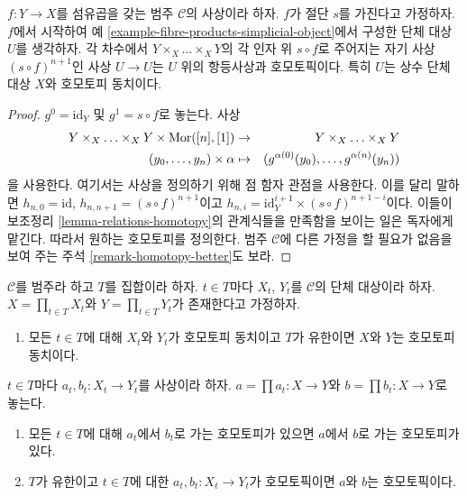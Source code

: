 \begin{lemma}
\label{lemma-fibre-products-simplicial-object-w-section}
$f : Y \to X$를 섬유곱을 갖는 범주 $\mathcal{C}$의 사상이라 하자.
$f$가 절단 $s$를 가진다고 가정하자. $f$에서 시작하여 예
\ref{example-fibre-products-simplicial-object}에서 구성한 단체 대상
$U$를 생각하자. 각 차수에서 $Y \times_X \ldots \times_X Y$의 각 인자
위 $s \circ f$로 주어지는 자기 사상 $(s \circ f)^{n + 1}$인 사상
$U \to U$는 $U$ 위의 항등사상과 호모토픽이다. 특히 $U$는 상수 단체
대상 $X$와 호모토피 동치이다.
\end{lemma}

\begin{proof}
$g^0 = \text{id}_Y$ 및 $g^1 = s \circ f$로 놓는다. 사상
\begin{eqnarray*}
Y \times_X \ldots \times_X Y \times \mathop{\mathrm{Mor}}\nolimits([n], [1])
& \to &
Y \times_X \ldots \times_X Y \\
(y_0, \ldots, y_n) \times \alpha
& \mapsto &
(g^{\alpha(0)}(y_0), \ldots, g^{\alpha(n)}(y_n))
\end{eqnarray*}
을 사용한다. 여기서는 사상을 정의하기 위해 점 함자 관점을 사용한다.
이를 달리 말하면
$h_{n, 0} = \text{id}$, $h_{n, n + 1} = (s \circ f)^{n + 1}$이고
$h_{n, i} = \text{id}_Y^{i + 1} \times (s \circ f)^{n + 1 - i}$이다.
이들이 보조정리 \ref{lemma-relations-homotopy}의 관계식들을 만족함을
보이는 일은 독자에게 맡긴다. 따라서 원하는 호모토피를 정의한다.
범주 $\mathcal{C}$에 다른 가정을 할 필요가 없음을 보여 주는 주석
\ref{remark-homotopy-better}도 보라.
\end{proof}

\begin{lemma}
\label{lemma-products-homotopy}
$\mathcal{C}$를 범주라 하고 $T$를 집합이라 하자. $t \in T$마다
$X_t$, $Y_t$를 $\mathcal{C}$의 단체 대상이라 하자.
$X = \prod_{t \in T} X_t$와 $Y = \prod_{t \in T} Y_t$가 존재한다고
가정하자.
\begin{enumerate}
\item 모든 $t \in T$에 대해 $X_t$와 $Y_t$가 호모토피 동치이고
$T$가 유한이면 $X$와 $Y$는 호모토피 동치이다.
\end{enumerate}
$t \in T$마다 $a_t, b_t : X_t \to Y_t$를 사상이라 하자.
$a = \prod a_t : X \to Y$와 $b = \prod b_t : X \to Y$로 놓는다.
\begin{enumerate}
\item[(2)] 모든 $t \in T$에 대해 $a_t$에서 $b_t$로 가는 호모토피가
있으면 $a$에서 $b$로 가는 호모토피가 있다.
\item[(3)] $T$가 유한이고 $t \in T$에 대한
$a_t, b_t : X_t \to Y_t$가 호모토픽이면 $a$와 $b$는 호모토픽이다.
\end{enumerate}
\end{lemma}

